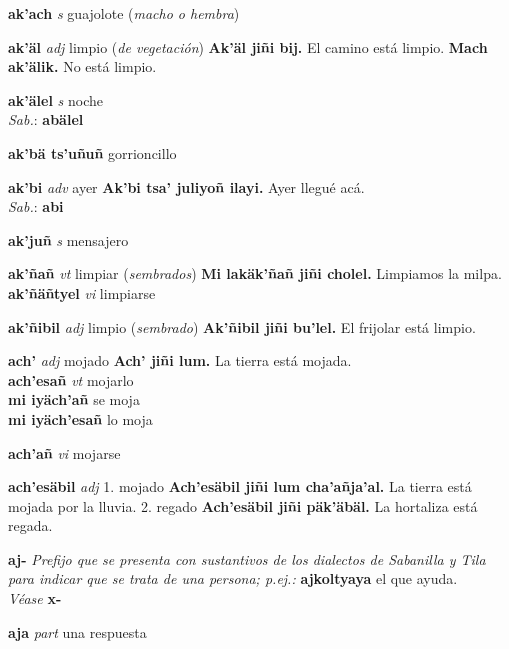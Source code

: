 \documentclass[10pt]{scrbook}
\newcommand{\entry}[1]{\textbf{#1}}
\newcommand{\onedefinition}[1]{#1.}
\newcommand{\nontranslationdef}[1]{\textit{#1}}
\newcommand{\partofspeech}[1]{\textit{#1}}
\newcommand{\spanishtranslation}[1]{#1}
\newcommand{\clarification}[1]{(\textit{#1})}
\newcommand{\cholexample}[1]{\textbf{#1}}
\newcommand{\exampletranslation}[1]{#1}
\newcommand{\dialectvariant}[1]{\\\textit{#1}:}
\newcommand{\dialectword}[1]{\textbf{#1}}
\newcommand{\alsosee}[1]{\\\textit{Véase} \textbf{#1}}
\newcommand{\secondaryentry}[1]{\\\textbf{#1}}
\newcommand{\secondpartofspeech}[1]{\textit{#1}}
\newcommand{\secondtranslation}[1]{#1}
\begin{document}
\begin{multicols}{2}
\entry{ak'ach}
\partofspeech{s}
\spanishtranslation{guajolote}
\clarification{macho o hembra}

\entry{ak'äl}
\partofspeech{adj}
\spanishtranslation{limpio}
\clarification{de vegetación}
\cholexample{Ak'äl jiñi bij.}
\exampletranslation{El camino está limpio.}
\cholexample{Mach ak'älik.}
\exampletranslation{No está limpio.}

\entry{ak'älel}
\partofspeech{s}
\spanishtranslation{noche}
\dialectvariant{Sab.}
\dialectword{abälel}

\entry{ak'bä ts'uñuñ}
\spanishtranslation{gorrioncillo}

\entry{ak'bi}
\partofspeech{adv}
\spanishtranslation{ayer}
\cholexample{Ak'bi tsa' juliyoñ ilayi.}
\exampletranslation{Ayer llegué acá.}
\dialectvariant{Sab.}
\dialectword{abi}

\entry{ak'juñ}
\partofspeech{s}
\spanishtranslation{mensajero}

\entry{ak'ñañ}
\partofspeech{vt}
\spanishtranslation{limpiar}
\clarification{sembrados}
\cholexample{Mi lakäk'ñañ jiñi cholel.}
\exampletranslation{Limpiamos la milpa.}
\secondaryentry{ak'ñäñtyel}
\secondpartofspeech{vi}
\secondtranslation{limpiarse}

\entry{ak'ñibil}
\partofspeech{adj}
\spanishtranslation{limpio}
\clarification{sembrado}
\cholexample{Ak'ñibil jiñi bu'lel.}
\exampletranslation{El frijolar está limpio.}

\entry{ach'}
\partofspeech{adj}
\spanishtranslation{mojado}
\cholexample{Ach' jiñi lum.}
\exampletranslation{La tierra está mojada.}
\secondaryentry{ach'esañ}
\secondpartofspeech{vt}
\secondtranslation{mojarlo}
\secondaryentry{mi iyäch'añ}
\secondtranslation{se moja}
\secondaryentry{mi iyäch'esañ}
\secondtranslation{lo moja}

\entry{ach'añ}
\partofspeech{vi}
\spanishtranslation{mojarse}

\entry{ach'esäbil}
\partofspeech{adj}
\onedefinition{1}
\spanishtranslation{mojado}
\cholexample{Ach'esäbil jiñi lum cha'añja'al.}
\exampletranslation{La tierra está mojada por la lluvia.}
\onedefinition{2}
\spanishtranslation{regado}
\cholexample{Ach'esäbil jiñi päk'äbäl.}
\exampletranslation{La hortaliza está regada.}

\entry{aj-}
\nontranslationdef{Prefijo que se presenta con sustantivos de los dialectos de Sabanilla y Tila para indicar que se trata de una persona; p.ej.:}
\cholexample{ajkoltyaya}
\exampletranslation{el que ayuda.}
\alsosee{x-}

\entry{aja}
\partofspeech{part}
\spanishtranslation{una respuesta}


\end{multicols}
\end{document}
